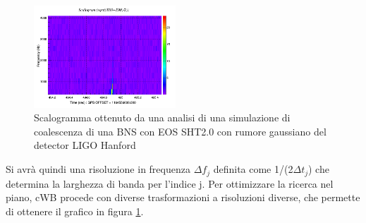 \begin{figure}
	\vspace{-15pt}
	\begin{center}
		\includegraphics[width=0.475\textwidth]{figures/Capitolo_3/L1_scalogram_0.png}
	\end{center}
	\vspace{-5pt}
	\caption{Scalogramma ottenuto da una analisi di una simulazione di coalescenza di una BNS con EOS SHT2.0 con rumore gaussiano del detector LIGO Hanford}
	\label{fig:scalogram_example}
	\vspace{-40pt}
\end{figure}
Si avrà quindi una risoluzione in frequenza $\Delta f_j$ definita come 1/(2$\Delta t_j$) che determina la larghezza di banda per l'indice j. Per ottimizzare la ricerca nel piano, cWB procede con diverse trasformazioni a risoluzioni diverse, che permette di ottenere il grafico in figura \ref{fig:scalogram_example}.
%
